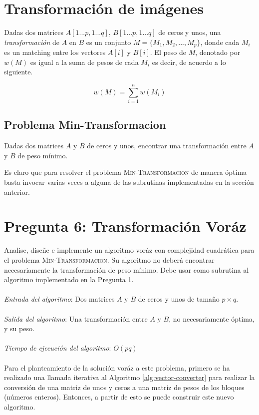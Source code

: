 \documentclass[conference]{IEEEtran}
\begin{document}
\section{Transformación de imágenes}
Dadas dos matrices $A[1...p, 1...q]$, $B[1...p,1...q]$ de ceros y unos, una \textit{transformación} de $A$ en $B$ es un conjunto $M=\{M_1,M_2,...,M_p\}$, donde cada $M_i$ es un matching entre los vectores $A[i]$ y $B[i]$. El peso de $M$, denotado por $w(M)$ es igual a la suma de pesos de cada $M_i$ es decir, de acuerdo a lo siguiente.

$$w(M)=\sum _{i=1}^nw\left(M_i\right)$$

\subsection{Problema Min-Transformacion}
Dadas dos matrices $A$ y $B$ de ceros y unos, encontrar una transformación entre $A$ y $B$ de peso mínimo.

Es claro que para resolver el problema \textsc{Min-Transformacion} de manera óptima basta invocar varias veces a alguna de las subrutinas implementadas en la sección anterior.

\section{Pregunta 6: Transformación Voráz}
Analise, diseñe e implemente un algoritmo voráz con complejidad cuadrática para el problema \textsc{Min-Transformacion}. Su algoritmo no deberá encontrar necesariamente la transformación de peso mínimo. Debe usar como subrutina al algoritmo implementado en la Pregunta 1.\\\\
\textit{Entrada del algoritmo}: Dos matrices $A$ y $B$ de ceros y unos de tamaño $p \times q$.\\\\
\textit{Salida del algoritmo}: Una transformación entre $A$ y $B$, no necesariamente óptima, y su peso.\\\\
\textit{Tiempo de ejecución del algoritmo}: $O(pq)$\\\\
Para el planteamiento de la solución voráz a este problema, primero se ha realizado una llamada iterativa al Algoritmo \ref{alg:vector-converter} para realizar la conversión de una matriz de unos y ceros a una matriz de pesos de los bloques (números enteros). Entonces, a partir de esto se puede construir este nuevo algoritmo.
\end{document}

